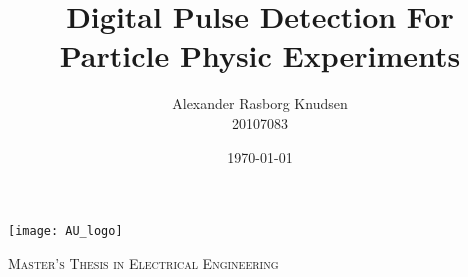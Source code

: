 \begin{titlepage}
	\title{Digital Pulse Detection For Particle Physic Experiments}
	\centering
	\texttt{[image: AU\_logo]}
	\par\vspace{1cm}
	{\scshape\LARGE Master's Thesis in Electrical Engineering \par}
	\vspace{1cm}
	
	\author{Alexander Rasborg Knudsen \\ 20107083}
	\date{\today}
\end{titlepage}

